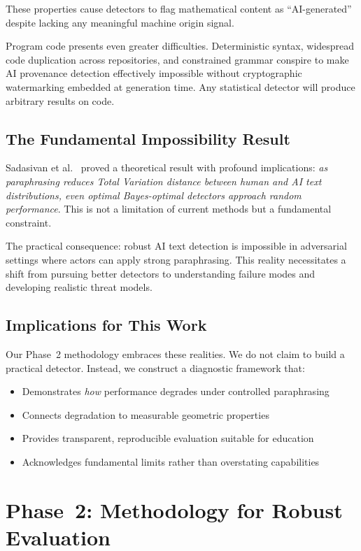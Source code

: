 \documentclass[conference]{IEEEtran}
\begin{document}
These properties cause detectors to flag mathematical content as ``AI-generated'' despite lacking any meaningful machine origin signal.

Program code presents even greater difficulties. Deterministic syntax, widespread code duplication across repositories, and constrained grammar conspire to make AI provenance detection effectively impossible without cryptographic watermarking embedded at generation time. Any statistical detector will produce arbitrary results on code.

\subsection{The Fundamental Impossibility Result}

Sadasivan et al.~\cite{sadasivan2023can} proved a theoretical result with profound implications: \emph{as paraphrasing reduces Total Variation distance between human and AI text distributions, even optimal Bayes-optimal detectors approach random performance}. This is not a limitation of current methods but a fundamental constraint.

The practical consequence: robust AI text detection is impossible in adversarial settings where actors can apply strong paraphrasing. This reality necessitates a shift from pursuing better detectors to understanding failure modes and developing realistic threat models.

\subsection{Implications for This Work}

Our Phase~2 methodology embraces these realities. We do not claim to build a practical detector. Instead, we construct a diagnostic framework that:
\begin{itemize}
    \item Demonstrates \emph{how} performance degrades under controlled paraphrasing
    \item Connects degradation to measurable geometric properties
    \item Provides transparent, reproducible evaluation suitable for education
    \item Acknowledges fundamental limits rather than overstating capabilities
\end{itemize}

\section{Phase~2: Methodology for Robust Evaluation}
\end{document}
